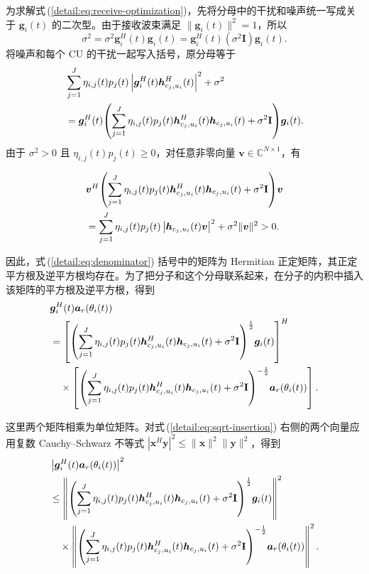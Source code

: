 \documentclass[11pt,a4paper]{ctexart}
\begin{document}
为求解式\,(\ref{detail:eq:receive-optimization})，先将分母中的干扰和噪声统一写成关于 $\bm g_i(t)$ 的二次型。由于接收波束满足 $\|\bm g_i(t)\|^2=1$，所以
\begin{equation}
\sigma^2=\sigma^2\bm g_i^H(t)\bm g_i(t)
=\bm g_i^H(t)(\sigma^2\mathbf I)\bm g_i(t).
\end{equation}
将噪声和每个 CU 的干扰一起写入括号，原分母等于
\begin{align}\label{detail:eq:denominator}
&\sum_{j=1}^J\eta_{i,j}(t)p_j(t)
\left|\bm g_i^H(t)\bm h_{c_j,u_i}^{H}(t)\right|^2+\sigma^2\notag\\
&=\bm g_i^H(t)\!\left(\sum_{j=1}^J\eta_{i,j}(t)p_j(t)
\bm h_{c_j,u_i}^{H}(t)\bm h_{c_j,u_i}(t)+\sigma^2\mathbf I\right)\!\bm g_i(t).
\end{align}
由于 $\sigma^2>0$ 且 $\eta_{i,j}(t)p_j(t)\ge0$，对任意非零向量 $\bm v\in\mathbb C^{N\times1}$，有
\begin{samepage}
\begin{align}
&\bm v^H\!\left(\sum_{j=1}^J\eta_{i,j}(t)p_j(t)
\bm h_{c_j,u_i}^{H}(t)\bm h_{c_j,u_i}(t)+\sigma^2\mathbf I\right)\!\bm v\notag\\
&=\sum_{j=1}^J\eta_{i,j}(t)p_j(t)
\left|\bm h_{c_j,u_i}(t)\bm v\right|^2+\sigma^2\|\bm v\|^2>0.
\end{align}
\end{samepage}
\begin{samepage}
因此，式\,(\ref{detail:eq:denominator}) 括号中的矩阵为 Hermitian 正定矩阵，其正定平方根及逆平方根均存在。为了把分子和这个分母联系起来，在分子的内积中插入该矩阵的平方根及逆平方根，得到
\begin{align}\label{detail:eq:sqrt-insertion}
&\bm g_i^H(t)\bm a_r(\theta_i(t))\notag\\
&=\left[\left(\sum_{j=1}^J\eta_{i,j}(t)p_j(t)
\bm h_{c_j,u_i}^{H}(t)\bm h_{c_j,u_i}(t)+\sigma^2\mathbf I\right)^{\frac12}\!\bm g_i(t)\right]^H\notag\\
&\quad\times\left[\left(\sum_{j=1}^J\eta_{i,j}(t)p_j(t)
\bm h_{c_j,u_i}^{H}(t)\bm h_{c_j,u_i}(t)+\sigma^2\mathbf I\right)^{-\frac12}\!\bm a_r(\theta_i(t))\right].
\end{align}
\end{samepage}
\begin{samepage}
这里两个矩阵相乘为单位矩阵。对式\,(\ref{detail:eq:sqrt-insertion}) 右侧的两个向量应用复数 Cauchy--Schwarz 不等式 $|\bm x^H\bm y|^2\le\|\bm x\|^2\|\bm y\|^2$，得到
\begin{align}\label{detail:eq:cs-norms}
&\left|\bm g_i^H(t)\bm a_r(\theta_i(t))\right|^2\notag\\
&\le\left\|\left(\sum_{j=1}^J\eta_{i,j}(t)p_j(t)
\bm h_{c_j,u_i}^{H}(t)\bm h_{c_j,u_i}(t)+\sigma^2\mathbf I\right)^{\frac12}\!\bm g_i(t)\right\|^2\notag\\
&\quad\times\left\|\left(\sum_{j=1}^J\eta_{i,j}(t)p_j(t)
\bm h_{c_j,u_i}^{H}(t)\bm h_{c_j,u_i}(t)+\sigma^2\mathbf I\right)^{-\frac12}\!\bm a_r(\theta_i(t))\right\|^2.
\end{align}
\end{samepage}
\end{document}
